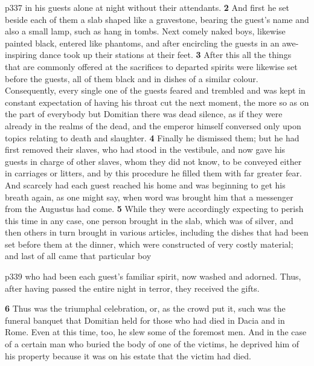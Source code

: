 p337 in his guests alone at night without their attendants. \textbf{2} And first he set beside each of them a slab shaped like a gravestone, bearing the guest's name and also a small lamp, such as hang in tombs. Next comely naked boys, likewise painted black, entered like phantoms, and after encircling the guests in an awe-inspiring dance took up their stations at their feet. \textbf{3} After this all the things that are commonly offered at the sacrifices to departed spirits were likewise set before the guests, all of them black and in dishes of a similar colour. Consequently, every single one of the guests feared and trembled and was kept in constant expectation of having his throat cut the next moment, the more so as on the part of everybody but Domitian there was dead silence, as if they were already in the realms of the dead, and the emperor himself conversed only upon topics relating to death and slaughter. \textbf{4} Finally he dismissed them; but he had first removed their slaves, who had stood in the vestibule, and now gave his guests in charge of other slaves, whom they did not know, to be conveyed either in carriages or litters, and by this procedure he filled them with far greater fear. And scarcely had each guest reached his home and was beginning to get his breath again, as one might say, when word was brought him that a messenger from the Augustus had come. \textbf{5} While they were accordingly expecting to perish this time in any case, one person brought in the slab, which was of silver, and then others in turn brought in various articles, including the dishes that had been set before them at the dinner, which were constructed of very costly material; and last of all came that particular boy

p339 who had been each guest's familiar spirit, now washed and adorned. Thus, after having passed the entire night in terror, they received the gifts.

\textbf{6} Thus was the triumphal celebration, or, as the crowd put it, such was the funeral banquet that Domitian held for those who had died in Dacia and in Rome. Even at this time, too, he slew some of the foremost men. And in the case of a certain man who buried the body of one of the victims, he deprived him of his property because it was on his estate that the victim had died.


